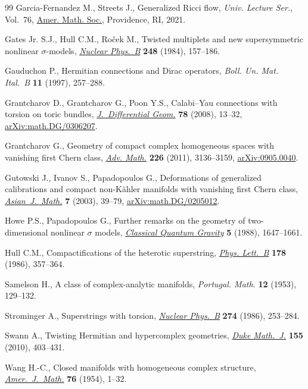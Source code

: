 \documentclass[11pt]{article}
\numberwithin{equation}{section}
\numberwithin{equation}{section}
\begin{document}
\begin{thebibliography}{99}
Garcia-Fernandez M., Streets J., Generalized {R}icci flow, \textit{Univ.
 Lecture Ser.}, Vol.~76, \href{https://doi.org/10.1090/ulect/076}{Amer. Math. Soc.}, Providence, RI, 2021.

Gates Jr. S.J., Hull C.M., Ro\v{c}ek M., Twisted multiplets and new
 supersymmetric nonlinear {$\sigma$}-models, \href{https://doi.org/10.1016/0550-3213(84)90592-3}{\textit{Nuclear Phys.~B}}
 \textbf{248} (1984), 157--186.

Gauduchon P., Hermitian connections and {D}irac operators, \textit{Boll. Un.
 Mat. Ital.~B} \textbf{11} (1997), 257--288.

Grantcharov D., Grantcharov G., Poon Y.S., Calabi--{Y}au connections with
 torsion on toric bundles, \href{https://doi.org/10.4310/jdg/1197320602}{\textit{J.~Differential Geom.}} \textbf{78} (2008),
 13--32, \href{https://arxiv.org/abs/math.DG/0306207}{arXiv:math.DG/0306207}.

Grantcharov G., Geometry of compact complex homogeneous spaces with vanishing
 first {C}hern class, \href{https://doi.org/10.1016/j.aim.2010.10.005}{\textit{Adv. Math.}} \textbf{226} (2011), 3136--3159,
 \href{https://arxiv.org/abs/0905.0040}{arXiv:0905.0040}.

Gutowski J., Ivanov S., Papadopoulos G., Deformations of generalized
 calibrations and compact non-{K}\"ahler manifolds with vanishing first
 {C}hern class, \href{https://doi.org/10.4310/AJM.2003.v7.n1.a4}{\textit{Asian~J.~Math.}} \textbf{7} (2003), 39--79,
 \href{https://arxiv.org/abs/math.DG/0205012}{arXiv:math.DG/0205012}.

Howe P.S., Papadopoulos G., Further remarks on the geometry of two-dimensional
 nonlinear {$\sigma$} models, \href{https://doi.org/10.1088/0264-9381/5/12/014}{\textit{Classical Quantum Gravity}} \textbf{5}
 (1988), 1647--1661.

Hull C.M., Compactifications of the heterotic superstring, \href{https://doi.org/10.1016/0370-2693(86)91393-6}{\textit{Phys.
 Lett.~B}} \textbf{178} (1986), 357--364.

Samelson H., A class of complex-analytic manifolds, \textit{Portugal. Math.}
 \textbf{12} (1953), 129--132.

Strominger A., Superstrings with torsion, \href{https://doi.org/10.1016/0550-3213(86)90286-5}{\textit{Nuclear Phys.~B}} \textbf{274}
 (1986), 253--284.

Swann A., Twisting {H}ermitian and hypercomplex geometries, \href{https://doi.org/10.1215/00127094-2010-059}{\textit{Duke
 Math.~J.}} \textbf{155} (2010), 403--431.

Wang H.-C., Closed manifolds with homogeneous complex structure,
 \href{https://doi.org/10.2307/2372397}{\textit{Amer.~J.~Math.}} \textbf{76} (1954), 1--32.

\end{thebibliography}
\end{document}
